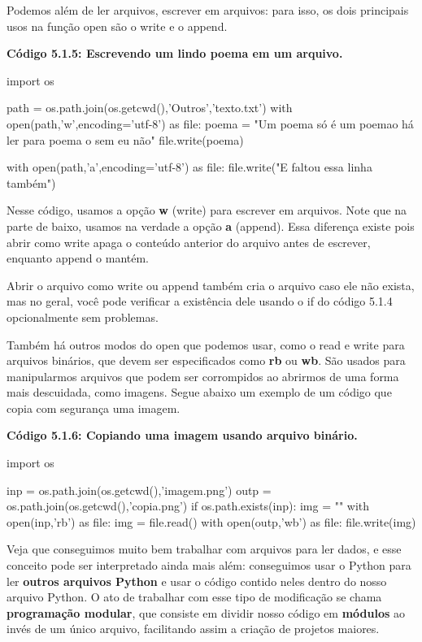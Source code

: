 \documentclass[11pt, a4paper]{article}
\begin{document}
Podemos além de ler arquivos, escrever em arquivos: para isso, os dois principais usos na função open são o write e o append.

\textbf{Código 5.1.5: Escrevendo um lindo poema em um arquivo.}

\begin{code}
import os

path = os.path.join(os.getcwd(),'Outros','texto.txt')
with open(path,'w',encoding='utf-8') as file:
    poema = "Um poema só é um poema\nSe o há ler para poema o sem eu não"
    file.write(poema)
    
with open(path,'a',encoding='utf-8') as file:
    file.write("E faltou essa linha também")
\end{code}

Nesse código, usamos a opção \textbf{w} (write) para escrever em arquivos. Note que na parte de baixo, usamos na verdade a opção \textbf{a} (append). Essa diferença existe pois abrir como write apaga o conteúdo anterior do arquivo antes de escrever, enquanto append o mantém.

Abrir o arquivo como write ou append também cria o arquivo caso ele não exista, mas no geral, você pode verificar a existência dele usando o if do código 5.1.4 opcionalmente sem problemas.

Também há outros modos do open que podemos usar, como o read e write para arquivos binários, que devem ser especificados como \textbf{rb} ou \textbf{wb}. São usados para manipularmos arquivos que podem ser corrompidos ao abrirmos de uma forma mais descuidada, como imagens. Segue abaixo um exemplo de um código que copia com segurança uma imagem.

\textbf{Código 5.1.6: Copiando uma imagem usando arquivo binário.}

\begin{code}
import os

inp = os.path.join(os.getcwd(),'imagem.png')
outp = os.path.join(os.getcwd(),'copia.png')
if os.path.exists(inp):
    img = ""
    with open(inp,'rb') as file:
        img = file.read()
    with open(outp,'wb') as file:
        file.write(img)
\end{code}

Veja que conseguimos muito bem trabalhar com arquivos para ler dados, e esse conceito pode ser interpretado ainda mais além: conseguimos usar o Python para ler \textbf{outros arquivos Python} e usar o código contido neles dentro do nosso arquivo Python. O ato de trabalhar com esse tipo de modificação se chama \textbf{programação modular}, que consiste em dividir nosso código em \textbf{módulos} ao invés de um único arquivo, facilitando assim a criação de projetos maiores.
\end{document}
